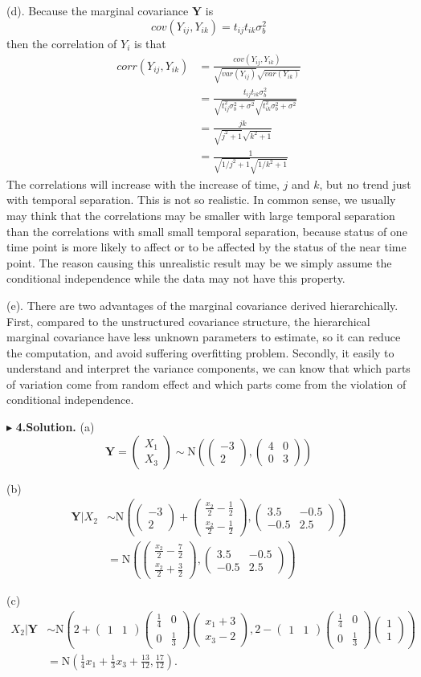 \documentclass[letterpaper, 12pt]{article}
\newcommand{\ba}{$$\begin{aligned}}
\newcommand{\ea}{\end{aligned}$$}
\newcommand{\lma}{\left(\begin{matrix}}
\newcommand{\rma}{\end{matrix}\right)}
\begin{document}
(d). Because the marginal covariance $\bm{Y}$ is
$$
cov(Y_{ij},Y_{ik})=t_{ij}t_{ik}\sigma_b^2
$$
then the correlation of $Y_i$ is that 
\ba
corr(Y_{ij},Y_{ik})&=\frac{cov(Y_{ij},Y_{ik})}{\sqrt{var(Y_{ij})}\sqrt{var(Y_{ik})}}\\
&=\frac{t_{ij}t_{ik}\sigma_b^2}{\sqrt{t_{ij}^2\sigma_b^2+\sigma^2}\sqrt{t_{ik}^2\sigma_b^2+\sigma^2}}\\
&=\frac{jk}{\sqrt{j^2+1}\sqrt{k^2+1}}\\
&=\frac{1}{\sqrt{1/j^2+1}\sqrt{1/k^2+1}}
\ea
The correlations will increase with the increase of time, $j$ and $k$, but no trend just with temporal separation. This is not so realistic. In common sense, we usually may think that the correlations may be smaller with large temporal separation than the correlations with small small temporal separation, because status of one time point is more likely to affect or to be affected by the status of the near time point. The reason causing this unrealistic result may be we simply assume the conditional independence while the data may not have this property.

(e). There are two advantages of the marginal covariance derived hierarchically. First, compared to the unstructured covariance structure, the hierarchical marginal covariance have less unknown parameters to estimate, so it can reduce the computation, and avoid suffering overfitting problem. Secondly, it easily to understand and interpret the variance components, we can know that which parts of variation come from random effect and which parts come from the violation of conditional independence.




$\blacktriangleright$ \textbf{4.\quad Solution.} 
(a) 
$$
\bm{Y}=\lma X_1\\X_3\rma\sim \text{N}\left(\lma -3 \\2\rma,\lma 4&0\\0&3\rma\right)
$$

(b)
\ba
\bm{Y}|X_2&\sim\text{N}\left(\lma -3\\2\rma+\lma \frac{x_2}{2}-\frac12\\\frac{x_2}2-\frac12\rma,\lma 3.5 &-0.5\\-0.5 &2.5\rma\right)\\
&=\text{N}\left(\lma \frac{x_2}{2}-\frac72\\\frac{x_2}2+\frac32\rma,\lma 3.5 &-0.5\\-0.5 &2.5\rma\right)
\ea


(c)
\ba
X_2|\bm{Y}&\sim\text{N}\left(2+\lma 1&1\rma\lma \frac14&0\\0&\frac13\rma\lma x_1+3\\x_3-2\rma, 2-\lma 1&1\rma\lma \frac14&0\\0&\frac13\rma\lma1\\1\rma\right)\\
&=\text{N}\left(\frac14x_1+\frac13x_3+\frac{13}{12},\frac{17}{12}\right).
\ea
\end{document}
